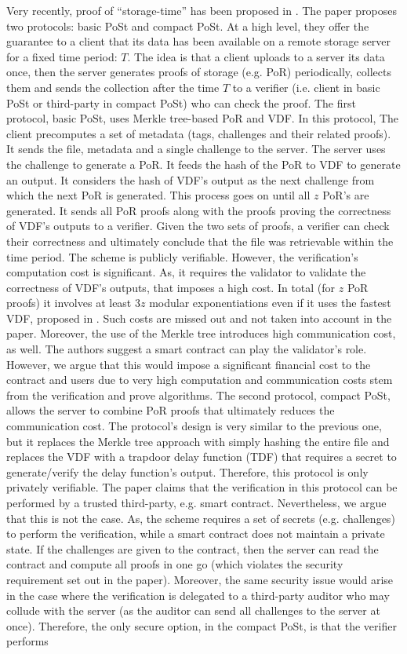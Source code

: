 Very recently, proof of ``storage-time'' has been proposed in \cite{Storage-Time}. The paper proposes two protocols: basic PoSt and compact PoSt. At a high level, they offer the guarantee to a client that its data has been available on a remote storage server for a fixed time period: $T$.  The idea is that a client uploads to a server its data once, then  the server generates proofs of storage (e.g. PoR) periodically, collects them and sends the collection after the time $T$ to a verifier (i.e. client in basic PoSt or third-party in compact PoSt) who can check the proof. The first protocol, basic PoSt, uses Merkle tree-based PoR and VDF. In this protocol, The client precomputes a set of metadata (tags, challenges and their related proofs). It  sends  the file, metadata and a single challenge to the server. The server uses the  challenge to generate a PoR. It feeds the hash of the PoR to VDF to generate an output. It considers the hash of VDF's output as the next challenge from which  the next PoR is generated. This process goes on until all $z$ PoR's are generated. It sends all PoR proofs along with the proofs proving the correctness of VDF's outputs to a verifier. Given the two sets of proofs, a verifier can check their correctness and ultimately conclude that the file was retrievable within the time period. The scheme is publicly verifiable. However, the verification's computation cost is significant.  As, it requires  the validator to validate the correctness of VDF's outputs, that imposes a high cost. In total (for $z$ PoR proofs) it involves at least $3z$ modular exponentiations even if it uses  the fastest VDF, proposed in \cite{Wesolowski19}. Such costs are missed out and not taken into account in the paper. Moreover, the use of the Merkle tree introduces high communication cost, as well. The authors suggest a smart contract can play the validator's role. However, we argue that this would impose a significant financial cost to the contract and users due to very high computation and communication costs stem from the verification and prove algorithms. The second protocol, compact PoSt, allows the server to combine PoR proofs that ultimately reduces the communication cost. The protocol's design is very similar to the previous one, but it replaces the Merkle tree approach with simply hashing the entire file and replaces the VDF with a trapdoor delay function (TDF) that requires a secret to generate/verify the delay function's output. Therefore, this protocol is only privately verifiable. The paper claims that the verification in this protocol can be performed by a trusted third-party, e.g. smart contract. Nevertheless, we argue that this is not the case. As,  the scheme requires a set of secrets (e.g. challenges) to perform the verification, while a smart contract does not maintain a private state. If the challenges are given to the contract, then the server can read the contract and compute all proofs in one go (which violates the security requirement set out in the paper). Moreover, the same security issue would arise in the case where the verification is delegated to a third-party auditor who may collude with the server (as the auditor can send all challenges to the server at once). Therefore, the only secure option, in the compact PoSt, is that  the verifier performs 